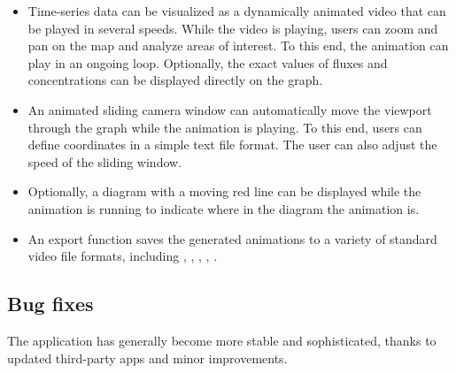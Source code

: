 \begin{dinglist}{52}
\begin{itemize}
  \item Time-series data can be visualized as a dynamically animated video that can be played in several speeds.
  While the video is playing, users can zoom and pan on the map and analyze areas of interest. 
  To this end, the animation can play in an ongoing loop. Optionally, the exact values of fluxes and concentrations can be displayed directly on the graph.
  \item An animated sliding camera window can automatically move the viewport through the graph while the animation is playing. To this end, users can define coordinates in a simple text file format.
  The user can also adjust the speed of the sliding window.
  \item Optionally, a diagram with a moving red line can be displayed while the animation is running to indicate where in the diagram the animation is.
  \item An export function saves the generated animations to a variety of standard video file formats, including \MOV, \AVI, \MPG, \WMV, \FLV.
  \end{itemize}
\end{dinglist}

\subsection{Bug fixes}

\begin{dinglist}{54}
\item The application has generally become more stable and sophisticated, thanks to updated third-party apps and minor improvements.
\end{dinglist}